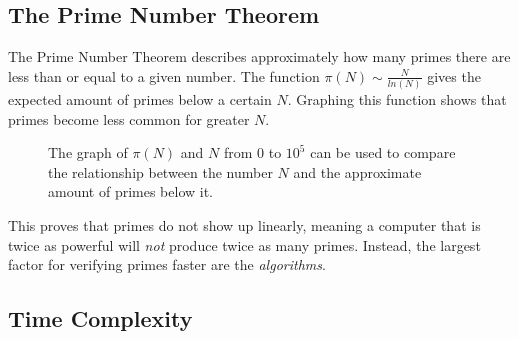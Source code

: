 \documentclass[main.tex]{subfiles}
\begin{document}
\subsection{The Prime Number Theorem}
The Prime Number Theorem \cite{theorem:prime_num} describes approximately how
many primes there are less than or equal to a given number. The function $\pi(N)
\sim \frac{N}{ln(N)}$ gives the expected amount of primes below a certain $N$.
Graphing this function shows that primes become less common for greater $N$.

\begin{figure}[ht]
  \begin{center}
  \end{center}
  \caption{The graph of $\pi(N)$ and $N$ from $0$ to $10^{5}$ can be used to
    compare the relationship between the number $N$ and the approximate amount
    of primes below it.}
\end{figure}

\noindent
This proves that primes do not show up linearly, meaning a computer that is
twice as powerful will \textit{not} produce twice as many primes. Instead, the
largest factor for verifying primes faster are the \textit{algorithms}.

\subsection{Time Complexity}
\end{document}
